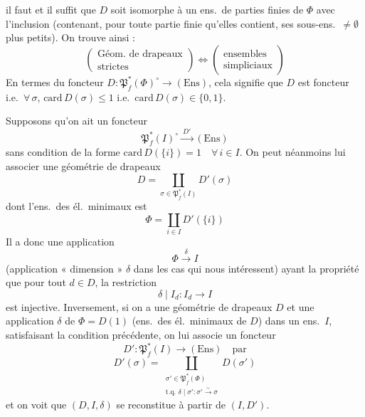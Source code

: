 \documentclass[11pt,a4paper]{article}
\begin{document}
il faut et il suffit que $D$ soit isomorphe à un ens.\ de parties finies
\add{$\neq \emptyset$} de $\Phi$ avec l'inclusion (contenant, pour toute
partie finie \uncertain{$\sigma$} qu'elles contient, ses sous-ens.\ $\neq
\emptyset$ plus petits). On trouve ainsi :
\[
  \left(
  \begin{array}{c}
    \text{Géom.\ de drapeaux} \\
    \text{strictes}
  \end{array}
  \right)
  \Longleftrightarrow
  \left(
  \begin{array}{c}
    \text{ensembles} \\
    \text{simpliciaux}
  \end{array}
  \right)
\]
En termes du foncteur $D : \mathfrak{P}_f^*(\Phi)^\circ \to
(\mathrm{Ens})$, cela signifie que $D$ est \struck{\ill{}}  foncteur \struck{\ill{}}  \struck{\ill{}}
i.e.\ $\forall\, \sigma$, \struck{\ill{}} $\mathrm{card}\, D(\sigma)
\leqslant 1$ i.e.\ $\mathrm{card}\, D(\sigma) \in \lbrace 0, 1 \rbrace$.

Supposons qu'on ait un foncteur
\[
  \mathfrak{P}_f^*(I)^\circ \xrightarrow{\ D'\ } (\mathrm{Ens})
\]
sans condition de la forme $\mathrm{card}\, D(\lbrace i \rbrace) = 1 \quad
\forall\, i \in I$. On peut néanmoins lui associer une géométrie de
drapeaux 
\[
  D = \coprod_{\sigma \in \mathfrak{P}_f^*(I)} D'(\sigma)
\]
dont l'ens.\ des él.\ minimaux est
\[
  \Phi = \coprod_{i \in I} D'(\lbrace i \rbrace)
\]
Il a donc une application
\[
  \Phi \xrightarrow{\ \delta\ } I
\]
(application « dimension » $\delta$ dans les cas qui nous intéressent)
ayant la propriété que pour tout $d \in D$, la restriction
\[
  \delta \mid I_d : I_d \to I
\]
est injective. Inversement, si on a une géométrie de drapeaux $D$ et une
application $\delta$ de $\Phi = D(1)$ (ens.\ des él.\ minimaux de $D$)
dans un ens.\ $I$, satisfaisant la condition précédente, on lui associe un
foncteur
\[
  D' : \mathfrak{P}_f^*(I) \to (\mathrm{Ens}) \quad \text{par}
\]
\[
  D'(\sigma) = \coprod_{\substack{\sigma' \in \mathfrak{P}_f^*(\Phi) \\
  \text{t.q.\ } \delta \mid \sigma' : \sigma' \xrightarrow{\sim} \sigma}}
  D(\sigma')
\]
et on voit que $(D, I, \delta)$ se reconstitue à partir de $(I, D')$.
\ill{}
\end{document}
